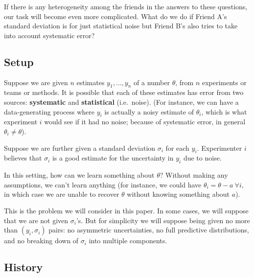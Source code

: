 \documentclass[letterpaper,12pt]{article}
\begin{document}
If there is any heterogeneity among the friends in the answers to these questions, our task will become even more complicated. What do we do if Friend A's standard deviation is for just statistical noise but Friend B's also tries to take into account systematic error?

\subsection{Setup}\label{setup}

Suppose we are given $n$ estimates $y_1,\ldots,y_n$ of a number $\theta$, from $n$ experiments or teams or methods. It is possible that each of these estimates has error from two sources: \textbf{systematic} and \textbf{statistical} (i.e.~noise). (For instance, we can have a data-generating process where $y_i$ is actually a noisy estimate of $\theta_i$, which is what experiment $i$ would see if it had no noise; because of systematic error, in general $\theta_i\neq \theta$).

Suppose we are further given a standard deviation $\sigma_i$ for each $y_i$. Experimenter $i$ believes that $\sigma_i$ is a good estimate for the uncertainty in $y_i$ due to noise.

In this setting, how can we learn something about $\theta$? Without making any assumptions, we can't learn anything (for instance, we could have $\theta_i=\theta-a\ \forall i$, in which case we are unable to recover $\theta$ without knowing something about $a$).

This is the problem we will consider in this paper. In some cases, we will suppose that we are not given $\sigma_i$'s. But for simplicity we will suppose being given no more than $(y_i,\sigma_i)$ pairs: no asymmetric uncertainties, no full predictive distributions, and no breaking down of $\sigma_i$ into multiple components.

\subsection{History}\label{sec:history}
\end{document}
